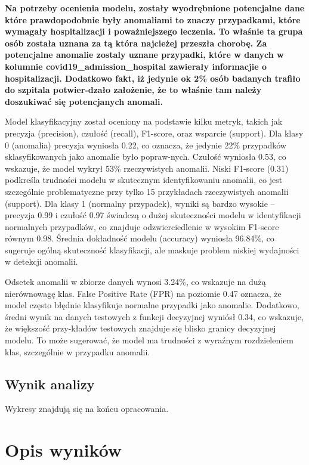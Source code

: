 \documentclass[a4paper,fleqn]{cas-dc}
\begin{document}
\textbf{Na potrzeby ocenienia modelu, zostały wyodrębnione potencjalne dane które prawdopodobnie były anomaliami to znaczy przypadkami, które wymagały hospitalizacji i poważniejszego leczenia. To właśnie ta grupa osób została uznana za tą która najcieżej przeszła chorobę. Za potencjalne anomalie zostaly uznane przypadki, które w danych w kolumnie covid19\_admission\_hospital zawierały informacjie o  hospitalizacji. Dodatkowo fakt, iż jedynie ok 2\% osób badanych trafiło do szpitala potwier-dzało założenie, że to właśnie tam należy doszukiwać się potencjanych anomali.}  

Model klasyfikacyjny został oceniony na podstawie kilku metryk, takich jak precyzja (precision), czułość (recall), F1-score, oraz wsparcie (support). Dla klasy 0 (anomalia) precyzja wyniosła 0.22, co oznacza, że jedynie 22\% przypadków sklasyfikowanych jako anomalie było popraw-nych. Czułość wyniosła 0.53, co wskazuje, że model wykrył 53\% rzeczywistych anomalii. Niski F1-score (0.31) podkreśla trudności modelu w skutecznym identyfikowaniu anomalii, co jest szczególnie problematyczne przy tylko 15 przykładach rzeczywistych anomalii (support). Dla klasy 1 (normalny przypadek), wyniki są bardzo wysokie – precyzja 0.99 i czułość 0.97 świadczą o dużej skuteczności modelu w identyfikacji normalnych przypadków, co znajduje odzwierciedlenie w wysokim F1-score równym 0.98. Średnia dokładność modelu (accuracy) wyniosła 96.84\%, co sugeruje ogólną skuteczność klasyfikacji, ale maskuje problem niskiej wydajności w detekcji anomalii.

Odsetek anomalii w zbiorze danych wynosi 3.24\%, co wskazuje na dużą nierównowagę klas. False Positive Rate (FPR) na poziomie 0.47 oznacza, że model często błędnie klasyfikuje normalne przypadki jako anomalie. Dodatkowo, średni wynik na danych testowych z funkcji decyzyjnej wyniósł 0.34, co wskazuje, że większość przy-kładów testowych znajduje się blisko granicy decyzyjnej modelu. To może sugerować, że model ma trudności z wyraźnym rozdzieleniem klas, szczególnie w przypadku anomalii.


\subsection{Wynik analizy}

 Wykresy znajdują się na końcu opracowania.


\section{Opis wyników}
\end{document}
